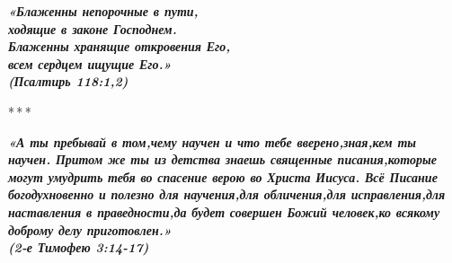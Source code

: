 \documentclass[fontsize=12pt,letterpaper,DIV=6]{scrartcl}
\begin{document}
\clearpage
\thispagestyle{empty}
{\centering\Large\itshape\bfseries «Блаженны непорочные в пути,\\ ходящие в законе Господнем.\\
Блаженны хранящие откровения Его,\\ всем сердцем ищущие Его.»\\
(Псалтирь 118:1,2)
\par}
\centerline{*\,*\,*}
{\centering\Large\itshape\bfseries «А ты пребывай в том,чему научен и что тебе вверено,зная,кем ты научен.
Притом же ты из детства знаешь священные писания,которые могут умудрить тебя во спасение верою во Христа Иисуса. 
Всё Писание богодухновенно и полезно для научения,для обличения,для исправления,для наставления в праведности,да будет совершен Божий человек,ко всякому доброму делу приготовлен.»\\

(2-е Тимофею 3:14-17)\par}
\end{document}
